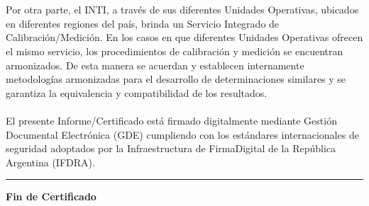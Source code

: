 \\\\
\noindent Por otra parte, el INTI, a través de sus diferentes Unidades Operativas, ubicados en diferentes regiones del país, brinda un Servicio Integrado de Calibración/Medición. En los casos en que diferentes Unidades Operativas ofrecen el mismo servicio, los procedimientos de calibración y medición se encuentran armonizados. De esta manera se acuerdan y establecen internamente metodologías armonizadas para el desarrollo de determinaciones similares y se garantiza la equivalencia y compatibilidad de los resultados.
\\\\
El presente Informe/Certificado está firmado digitalmente mediante Gestión Documental Electrónica (GDE)
cumpliendo con los estándares internacionales de seguridad adoptados por la Infraestructura de FirmaDigital de
la República Argentina (IFDRA).
\vskip 2mm
\hrule
\vskip 1mm
\noindent \textbf{Fin de Certificado}
